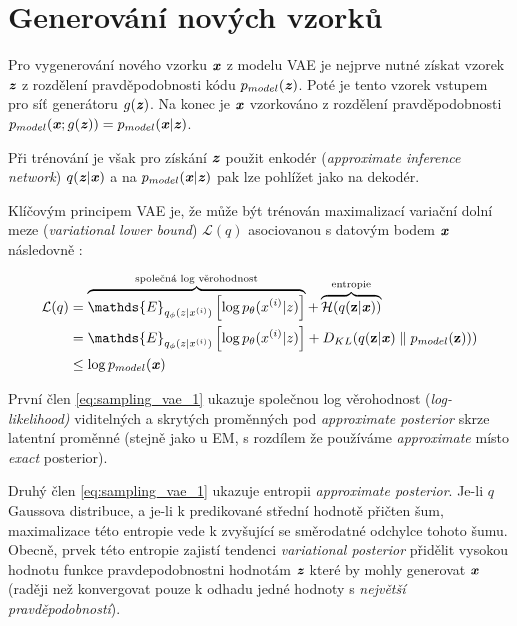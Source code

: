 \section{Generování nových vzorků}
\label{sec:vae_generating_new_data}
Pro vygenerování nového vzorku $\textbf{\emph{x}}$ z modelu VAE je nejprve nutné získat vzorek $\textbf{\emph{z}}$ z rozdělení pravděpodobnosti kódu $p_{model}(\textbf{\emph{z}})$.
Poté je tento vzorek vstupem pro síť generátoru $g(\textbf{\emph{z}})$. Na konec je $\textbf{\emph{x}}$ vzorkováno z rozdělení pravděpodobnosti $p_{model}(\textbf{\emph{x}};g(\textbf{\emph{z}})) = p_{model}(\textbf{\emph{x}}\mid\textbf{\emph{z}})$. \cite{Kingma2014}

Při trénování je však pro získání $\textbf{\emph{z}}$ použit enkodér (\emph{approximate inference network}) $q(\textbf{\emph{z}}\mid\textbf{\emph{x}})$ a na $p_{model}(\textbf{\emph{x}}\mid\textbf{\emph{z}})$ pak lze pohlížet jako na dekodér. \cite{Kingma2014}

Klíčovým principem VAE je, že může být trénován maximalizací variační dolní meze (\emph{variational lower bound}) $\mathcal{L}(q)$ asociovanou s datovým bodem $\textbf{\emph{x}}$ následovně \cite{Goodfellow2016}: 

\begin{align}
    \mathcal{L}(q) &= \overbrace{ \mathds{E}_{q_\phi(z\mid x^{(i)})} \left[ \log p_\theta(x^{(i)}\mid z) \right] }^\text{společná log věrohodnost} + \overbrace{ \mathcal{H}(q(\textbf{z} \mid \textbf{\emph{x}})) }^\text{entropie} \label{eq:sampling_vae_1} \\
    &= \mathds{E}_{q_\phi(z\mid x^{(i)})} \left[ \log p_\theta(x^{(i)}\mid z) \right] + D_{KL}(q(\textbf{z} \mid \textbf{\emph{x}})\parallel p_{model}(\textbf{z}))) \label{eq:sampling_vae_2} \\
    &\leq \log p_{model}(\textbf{\emph{x}})
\end{align}

První člen \autoref{eq:sampling_vae_1} ukazuje společnou log věrohodnost (\emph{log-likelihood)} viditelných a skrytých proměnných pod \emph{approximate posterior} skrze latentní proměnné (stejně jako u EM, s rozdílem že používáme \emph{approximate} místo \emph{exact} posterior). \cite{Goodfellow2016}

Druhý člen \autoref{eq:sampling_vae_1} ukazuje entropii \emph{approximate posterior}.
Je-li $q$ Gaussova distribuce, a je-li k predikované střední hodnotě přičten šum, maximalizace této entropie vede k zvyšující se směrodatné odchylce tohoto šumu.
Obecně, prvek této entropie zajistí tendenci \emph{variational posterior} přidělit vysokou hodnotu funkce pravdepodobnostni hodnotám $\textbf{\emph{z}}$ které by mohly generovat $\textbf{\emph{x}}$ (raději než konvergovat pouze k odhadu jedné hodnoty s \emph{největší pravděpodobností}). \cite{Goodfellow2016}

